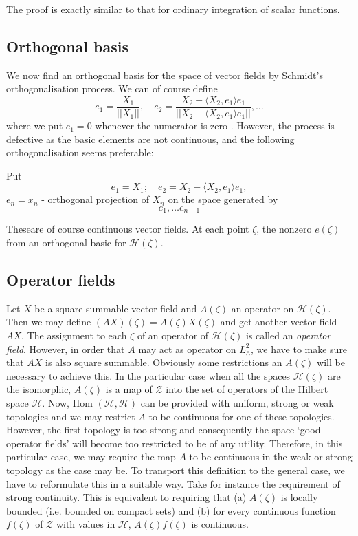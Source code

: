 The proof is exactly similar to that for ordinary integration of
scalar functions. 

\subsection{Orthogonal basis}\label{partIII-chap1-sec1.5} %

We now find an orthogonal basis for the space of vector fields by
Schmi\-dt's orthogonalisation process. We can of course define 
$$
e_1=\frac{X_1}{|| X_1 ||},\quad e_2=\frac{X_2-\langle X_2,e_1 \rangle
  e_1}{|| X_2-\langle X_2,e_1\rangle e_1 ||},\ldots 
$$
where we put $e_1=0$ whenever the numerator is zero  \cite{key20}. However,
the process is defective as the basic elements are not continuous, and
the following orthogonalisation seems preferable:  

Put 
$$
e_1=X_1;\quad e_2=X_2- \langle X_2, e_1\rangle e_1,
$$
$e_n = x_n$ - orthogonal projection of $X_n$ on the space generated by
$$
e_1,\ldots e_{n-1}
$$


These\pageoriginale are of course continuous vector fields. At each
point $\zeta$, 
the nonzero $e(\zeta)$ from an orthogonal basic for
$\mathscr{H}(\zeta)$. 
 
\subsection{Operator fields}\label{partIII-chap1-sec1.6}
 
Let $X$ be a square summable vector field and  $A(\zeta)$ an operator
on $\mathscr{H}(\zeta)$. Then we may
define $(AX)(\zeta)=A(\zeta)X(\zeta)$ and get another vector field
$AX$. The assignment to each $\zeta$ of an operator of
$\mathscr{H}(\zeta)$  is called an \textit{operator field}. However,
in order that $A$ may act as operator on $L^2_\wedge$, we have to make
sure that $AX$ is also square summable. Obviously some restrictions an
$A(\zeta)$ will be necessary to achieve this. In the particular case
when all the spaces 
$\mathscr{H}(\zeta)$ are the isomorphic, $A(\zeta)$ is a map of
$\mathcal{Z}$ into the set of operators of the Hilbert space
$\mathscr{H}$. Now, Hom $(\mathscr{H},\mathscr{H})$  can be provided
with uniform, strong or weak topologies and we may restrict $A$ to be
continuous for one of these topologies. However, the first topology is
too strong and consequently the space `good operator fields' will
become too restricted to be of any utility. Therefore, in this
particular case, we may require the map $A$ to be continuous in the
weak or strong topology as  
 the case may  be. To transport this definition to the general case,
 we have to reformulate this in a suitable way. Take for instance the
 requirement of strong continuity. This is equivalent to requiring
 that  
(a) $A(\zeta)$ is locally bounded (i.e. bounded on compact sets) and
(b) for every continuous function $f(\zeta)$ of $\mathcal{Z}$ with
values in $\mathscr{H}$, $A(\zeta)f(\zeta)$ is continuous. 

